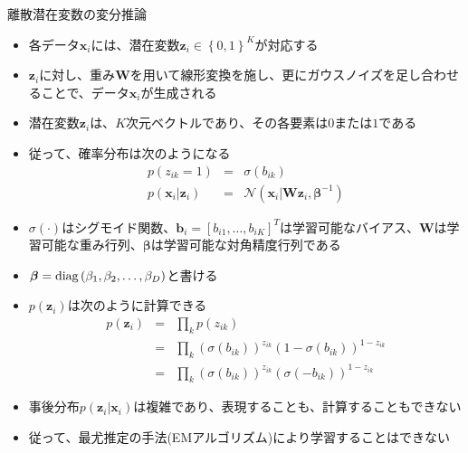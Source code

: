 \documentclass[dvipdfmx,notheorems,t]{beamer}
\begin{document}
\begin{frame}{離散潜在変数の変分推論}
\begin{itemize}
\begin{itemize}
		\item 各データ$\bm{x}_i$には、潜在変数$\bm{z}_i \in \left\{ 0, 1 \right\}^K$が対応する
		\item $\bm{z}_i$に対し、重み$\bm{W}$を用いて\alert{線形変換}を施し、更に\alert{ガウスノイズ}を足し合わせることで、データ$\bm{x}_i$が生成される
		\newline
		
		\item 潜在変数$\bm{z}_i$は、$K$次元ベクトルであり、その\color{red}各要素は$0$または$1$\normalcolor である
		\newline
		
		\item 従って、確率分布は次のようになる
		\begin{eqnarray}
			p(z_{ik} = 1) &=& \sigma(b_{ik}) \\
			p(\bm{x}_i | \bm{z}_i) &=& \mathcal{N}(\bm{x}_i | \bm{W} \bm{z}_i, \bm{\beta}^{-1})
		\end{eqnarray}
		
		\item $\sigma(\cdot)$はシグモイド関数、$\bm{b}_i = \left[ b_{i1}, \ldots, b_{iK} \right]^T$は学習可能な\alert{バイアス}、$\bm{W}$は学習可能な\alert{重み行列}、$\bm{\beta}$は学習可能な\alert{対角精度行列}である
		\item $\bm{\beta} = \operatorname{diag} \left( \beta_1, \beta_2, \ldots, \beta_D \right)$と書ける
		\newline
		
		\item $p(\bm{z}_i)$は次のように計算できる
		\begin{eqnarray}
			p(\bm{z}_i) &=& \prod_k p(z_{ik}) \\
			&=& \prod_k \left( \sigma(b_{ik}) \right)^{z_{ik}} \left( 1 - \sigma(b_{ik}) \right)^{1 - z_{ik}} \\
			&=& \prod_k \left( \sigma(b_{ik}) \right)^{z_{ik}} \left( \sigma(-b_{ik}) \right)^{1 - z_{ik}}
		\end{eqnarray}
		
		\item 事後分布$p(\bm{z}_i | \bm{x}_i)$は\alert{複雑}であり、表現することも、計算することもできない
		\item 従って、最尤推定の手法(EMアルゴリズム)により学習することはできない
		\newline
		

\end{itemize}
\end{itemize}
\end{frame}
\end{document}
